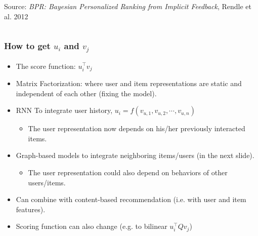 \documentclass[11pt]{beamer}
\begin{document}
\begin{frame}
\begin{columns}
\begin{column}{0.4\textwidth}
\begin{center}
					{\tiny Source: \textit{BPR: Bayesian Personalized Ranking from Implicit Feedback}, Rendle et al. 2012}
				\end{center}
			\end{column}
		\end{columns}
	\end{frame}

	\begin{frame}
		\frametitle{How to get $u_i$ and $v_j$}
		\begin{itemize}
			\item The score function: $u_i^\top v_j$ \pause
			\item Matrix Factorization: where user and item representations are static and independent of each other (fixing the model). \pause
			\item RNN To integrate user history, $u_i = f(v_{u, 1}, v_{u, 2}, \cdots, v_{u, n})$
			\begin{itemize}
				\item The user representation now depends on his/her previously interacted items. \pause
			\end{itemize}
			\item Graph-based models to integrate neighboring items/users (in the next slide).
			\begin{itemize}
				\item The user representation could also depend on behaviors of other users/items.  \pause
			\end{itemize}
			\item Can combine with content-based recommendation (i.e. with user and item features). \pause
			\item Scoring function can also change (e.g. to bilinear $u_i^\top Q v_j$)
		\end{itemize}
	\end{frame}
\end{document}

